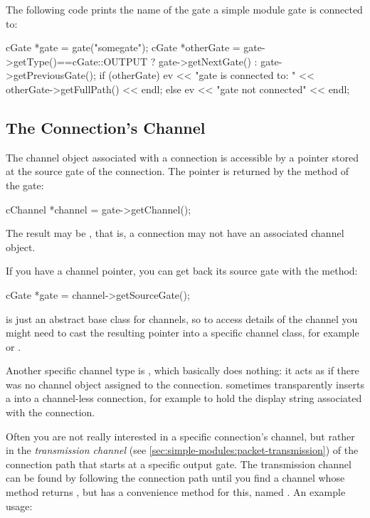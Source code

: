 The following code prints the name of the gate a simple module gate is
connected to:

\begin{cpp}
cGate *gate = gate("somegate");
cGate *otherGate = gate->getType()==cGate::OUTPUT ? gate->getNextGate() :
                                                    gate->getPreviousGate();
if (otherGate)
  ev << "gate is connected to: " << otherGate->getFullPath() << endl;
else
  ev << "gate not connected" << endl;
\end{cpp}


\subsection{The Connection's Channel}

The channel object associated with a connection is accessible by
a pointer stored at the source gate of the connection. The pointer
is returned by the  method of the gate:

\begin{cpp}
cChannel *channel = gate->getChannel();
\end{cpp}

The result may be , that is, a connection may not have
an associated channel object.

If you have a channel pointer, you can get back its source gate
with the  method:

\begin{cpp}
cGate *gate = channel->getSourceGate();
\end{cpp}

 is just an abstract base class for channels, so
to access details of the channel you might need to cast the resulting
pointer into a specific channel class, for example 
or .

Another specific channel type is , which basically
does nothing: it acts as if there was no channel object assigned to the
connection. {\opp} sometimes transparently inserts a 
into a channel-less connection, for example to hold the display string
associated with the connection.

Often you are not really interested in a specific connection's channel, but
rather in the \textit{transmission channel} (see
\ref{sec:simple-modules:packet-transmission}) of the connection path that
starts at a specific output gate. The transmission channel can be found by
following the connection path until you find a channel whose
 method returns , but
 has a convenience method for this, named
. An example usage:


